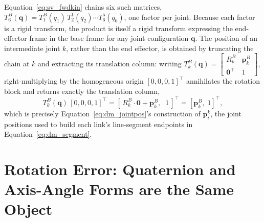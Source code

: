 Equation~\eqref{eq:sv_fwdkin} chains six such matrices, $T^{B}_{6}(\mathbf{q}) = T^{B}_{1}(q_1)\,
T^{1}_{2}(q_2) \cdots T^{5}_{6}(q_6)$, one factor per joint. Because each factor is a rigid
transform, the product is itself a rigid transform expressing the end-effector frame in the base
frame for any joint configuration $\mathbf{q}$. The position of an intermediate joint $k$, rather
than the end effector, is obtained by truncating the chain at $k$ and extracting its translation
column: writing $T^{B}_{k}(\mathbf{q}) = \left[\begin{smallmatrix} R^{B}_{k} & \mathbf{p}^{B}_{k} \\
\mathbf{0}^\top & 1\end{smallmatrix}\right]$, right-multiplying by the homogeneous origin
$[0,0,0,1]^\top$ annihilates the rotation block and returns exactly the translation column,
\begin{equation}
T^{B}_{k}(\mathbf{q})\,[0,0,0,1]^\top = \left[\, R^{B}_{k}\cdot\mathbf{0} + \mathbf{p}^{B}_{k},\;\; 1
\,\right]^\top = [\mathbf{p}^{B}_{k},\; 1]^\top,
\label{eq:appA_originextract}
\end{equation}
which is precisely Equation~\eqref{eq:dm_jointpos}'s construction of $\mathbf{p}_i^k$, the joint
positions used to build each link's line-segment endpoints in Equation~\eqref{eq:dm_segment}.

\section{Rotation Error: Quaternion and Axis-Angle Forms are the Same Object}\label{sec:appA_rot}

